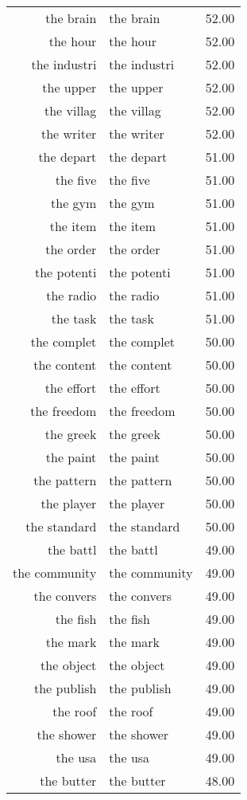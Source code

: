\begin{table}[ht]
\begin{tabular}{rlr}
  the brain & the brain & 52.00 \\ 
  the hour & the hour & 52.00 \\ 
  the industri & the industri & 52.00 \\ 
  the upper & the upper & 52.00 \\ 
  the villag & the villag & 52.00 \\ 
  the writer & the writer & 52.00 \\ 
  the depart & the depart & 51.00 \\ 
  the five & the five & 51.00 \\ 
  the gym & the gym & 51.00 \\ 
  the item & the item & 51.00 \\ 
  the order & the order & 51.00 \\ 
  the potenti & the potenti & 51.00 \\ 
  the radio & the radio & 51.00 \\ 
  the task & the task & 51.00 \\ 
  the complet & the complet & 50.00 \\ 
  the content & the content & 50.00 \\ 
  the effort & the effort & 50.00 \\ 
  the freedom & the freedom & 50.00 \\ 
  the greek & the greek & 50.00 \\ 
  the paint & the paint & 50.00 \\ 
  the pattern & the pattern & 50.00 \\ 
  the player & the player & 50.00 \\ 
  the standard & the standard & 50.00 \\ 
  the battl & the battl & 49.00 \\ 
  the community & the community & 49.00 \\ 
  the convers & the convers & 49.00 \\ 
  the fish & the fish & 49.00 \\ 
  the mark & the mark & 49.00 \\ 
  the object & the object & 49.00 \\ 
  the publish & the publish & 49.00 \\ 
  the roof & the roof & 49.00 \\ 
  the shower & the shower & 49.00 \\ 
  the usa & the usa & 49.00 \\ 
  the butter & the butter & 48.00 \\ 

\end{tabular}
\end{table}
